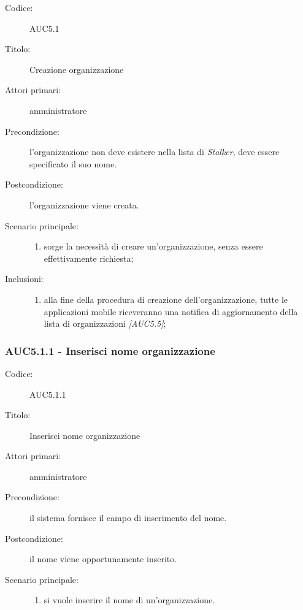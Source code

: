 \documentclass[../../../analisi-dei-requisiti.tex]{subfiles}
\begin{document}
  \begin{description}
    \item[Codice:] AUC5.1
    \item[Titolo:] Creazione organizzazione
    \item[Attori primari:] amministratore
    \item[Precondizione:] l'organizzazione non deve esistere nella lista di \emph{Stalker}, deve essere specificato il suo nome.
    \item[Postcondizione:] l'organizzazione viene creata.
    \item[Scenario principale:]
    \begin{enumerate}
      \item sorge la necessità di creare un'organizzazione, senza essere effettivamente richiesta;
    \end{enumerate}
    \item[Inclusioni:]
    \begin{enumerate}
      \item alla fine della procedura di creazione dell'organizzazione, tutte le applicazioni mobile riceveranno una notifica di aggiornamento della lista di organizzazioni \emph{[AUC5.5]};
    \end{enumerate}
  \end{description}

\subsubsection{AUC5.1.1 - Inserisci nome organizzazione}%
  \label{subs:AUC5.1.1}
  \begin{description}
    \item[Codice:] AUC5.1.1
    \item[Titolo:] Inserisci nome organizzazione
    \item[Attori primari:] amministratore
    \item[Precondizione:] il sistema fornisce il campo di inserimento del nome.
    \item[Postcondizione:] il nome viene opportunamente inserito.
    \item[Scenario principale:]
    \begin{enumerate}
      \item si vuole inserire il nome di un'organizzazione.
    \end{enumerate}

  \end{description}
\end{document}

